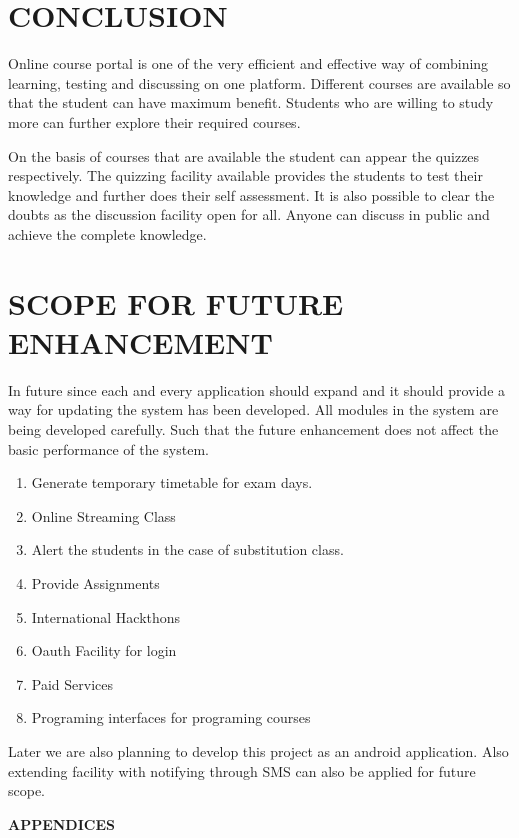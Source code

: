 %
%
%
%
\chapter{CONCLUSION}
Online course portal is one of the very efficient and effective way of combining learning, testing and discussing on one platform. Different courses are available so that  the student can have maximum benefit. Students who are willing to study more can further explore their required courses. 

On the basis of courses that  are available the student can appear the quizzes respectively. The quizzing facility available provides the students to test their knowledge and further does their self assessment. It is also possible to clear the doubts as the discussion facility open for all. Anyone can discuss in public and achieve the complete knowledge.

%
\chapter{SCOPE FOR FUTURE ENHANCEMENT}
In future since each and every application should expand and it should provide a way for updating the system has been developed. All modules in the system are being developed carefully. Such that the future enhancement does not affect the basic performance of the system.
\begin{enumerate}
 \item Generate temporary timetable for exam days.
\item Online Streaming Class
\item Alert the students in the case of substitution class.
\item Provide Assignments
\item International Hackthons
\item Oauth Facility for login 
\item Paid Services
\item Programing interfaces for programing courses
\end{enumerate}
Later we are also planning to develop this project as an android application. Also extending facility with notifying through SMS can also be applied for future scope.

%
%
%
%
\clearpage
{}
\appendix
\quad\vfill
\begin{center}
{\Huge \bf APPENDICES}
\end{center}
\vfill
\clearpage
%
%
%
%
